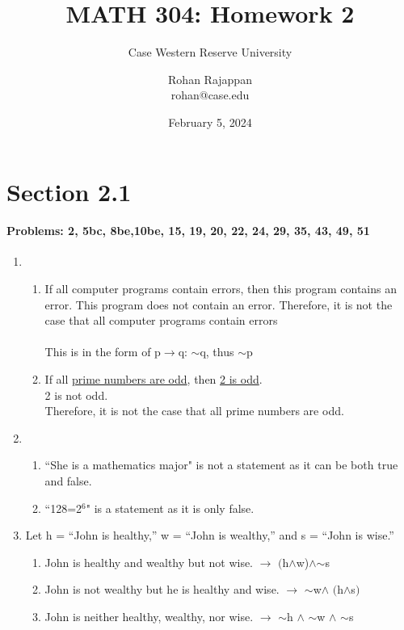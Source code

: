 \documentclass{article}
\title{MATH 304: Homework 2}
\subtitle{Case Western Reserve University}
\author{Rohan Rajappan \\rohan@case.edu}
\date{February 5, 2024}
\makeatletter
\newcommand\setItemnumber[1]{\setcounter{enum\romannumeral\@enumdepth}{\numexpr#1-1\relax}}
\makeatother
\begin{document}
\maketitle

\section{Section 2.1}
 \paragraph{Problems: 2, 5bc, 8be,10be, 15, 19, 20, 22, 24, 29, 35, 43, 49, 51}



\begin{enumerate}
  \setItemnumber{2}
  \item
  \begin{enumerate}
    \item If all computer programs contain errors, then this program contains an error. This program does not contain an error. Therefore, it is not the case that all computer programs contain errors\\\\
    This is in the form of p$\rightarrow$q: $\sim$q, thus $\sim$p
    \item If all \underline{prime numbers are odd}, then \underline{2 is odd}.\\2 is not odd.\\Therefore, it is not the case that all prime numbers are odd.
  \end{enumerate}
  \setItemnumber{5}
  \item 
  \begin{enumerate}
      \setItemnumber{2}
      \item ``She is a mathematics major" is not a statement as it can be both true and false.
      \item``128=2$^6$" is a statement as it is only false.
  \end{enumerate}
  \setItemnumber{8}
  \item Let h = ``John is healthy,” w = ``John is wealthy,” and s = ``John is wise.”
  \begin{enumerate}
      \item John is healthy and wealthy but not wise. $\rightarrow$ $($h$\land$w$ $)$\land$$\sim$s
      \item John is not wealthy but he is healthy and wise. $\rightarrow$ $\sim$w$\land$ $($h$\land$s$)$
      \item John is neither healthy, wealthy, nor wise. $\rightarrow$ $\sim$h $\land$ $\sim$w $\land$ $\sim$s
$$
\end{enumerate}
\end{enumerate}
\end{document}
